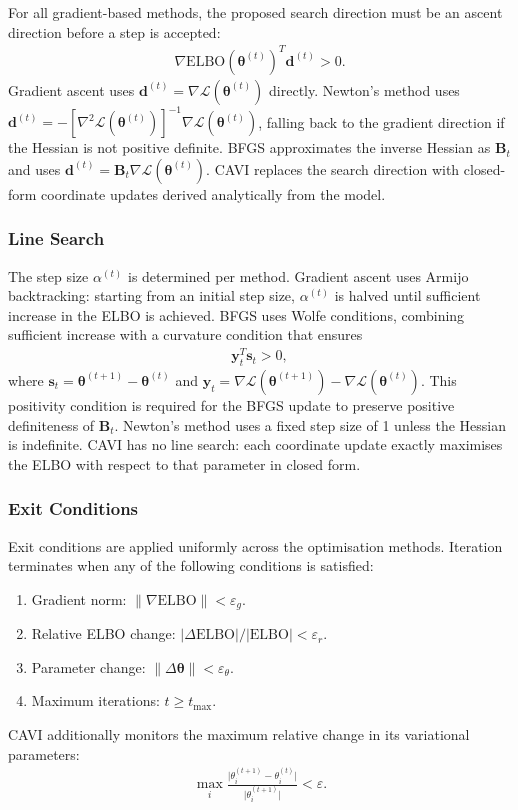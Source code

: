 \documentclass[11pt,a4paper]{article}
\newcommand{\ELBO}{\text{ELBO}}
\begin{document}
For all gradient-based methods, the proposed search direction must be an ascent
direction before a step is accepted:
\begin{align}
\nabla \ELBO(\bm{\theta}^{(t)})^T \bm{d}^{(t)} > 0.
\end{align}
Gradient ascent uses $\bm{d}^{(t)} = \nabla\mathcal{L}(\bm{\theta}^{(t)})$ directly.
Newton's method uses $\bm{d}^{(t)} = -[\nabla^2\mathcal{L}(\bm{\theta}^{(t)})]^{-1}\nabla\mathcal{L}(\bm{\theta}^{(t)})$,
falling back to the gradient direction if the Hessian is not positive definite.
BFGS approximates the inverse Hessian as $\bm{B}_t$ and uses
$\bm{d}^{(t)} = \bm{B}_t \nabla\mathcal{L}(\bm{\theta}^{(t)})$.
CAVI replaces the search direction with closed-form coordinate updates derived
analytically from the model.

\subsubsection*{Line Search}

The step size $\alpha^{(t)}$ is determined per method.
Gradient ascent uses Armijo backtracking: starting from an initial step size,
$\alpha^{(t)}$ is halved until sufficient increase in the ELBO is achieved.
BFGS uses Wolfe conditions, combining sufficient increase with a curvature condition
that ensures
\begin{align}
\bm{y}_t^T \bm{s}_t > 0,
\end{align}
where $\bm{s}_t = \bm{\theta}^{(t+1)} - \bm{\theta}^{(t)}$ and
$\bm{y}_t = \nabla\mathcal{L}(\bm{\theta}^{(t+1)}) - \nabla\mathcal{L}(\bm{\theta}^{(t)})$.
This positivity condition is required for the BFGS update to preserve positive
definiteness of $\bm{B}_t$.
Newton's method uses a fixed step size of 1 unless the Hessian is indefinite.
CAVI has no line search: each coordinate update exactly maximises the ELBO with
respect to that parameter in closed form.

\subsubsection*{Exit Conditions}

Exit conditions are applied uniformly across the optimisation methods.
Iteration terminates when any of the following conditions is satisfied:
\begin{enumerate}[label=(\roman*)]
  \item Gradient norm: $\lVert \nabla \ELBO \rVert < \varepsilon_g$.
  \item Relative ELBO change: $\lvert \Delta \ELBO \rvert / \lvert \ELBO \rvert < \varepsilon_r$.
  \item Parameter change: $\lVert \Delta \bm{\theta} \rVert < \varepsilon_\theta$.
  \item Maximum iterations: $t \geq t_{\max}$.
\end{enumerate}
CAVI additionally monitors the maximum relative change in its variational parameters:
\begin{align}
\max_i \frac{\lvert \theta_i^{(t+1)} - \theta_i^{(t)} \rvert}{\lvert \theta_i^{(t+1)} \rvert} < \varepsilon.
\end{align}
\end{document}
